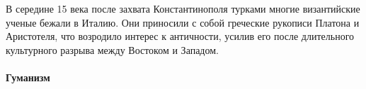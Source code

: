 В середине 15 века после захвата Константинополя турками многие византийские ученые бежали в Италию. Они приносили с собой греческие рукописи Платона и Аристотеля, что возродило интерес к античности, усилив его после длительного культурного разрыва между Востоком и Западом.

\paragraph{Гуманизм} 
